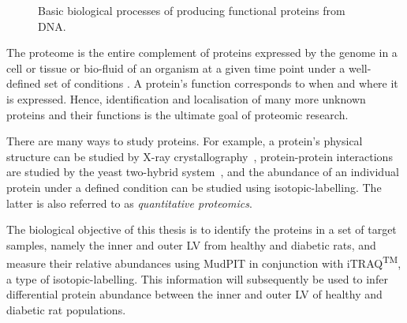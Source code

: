 \documentclass[11pt,a4paper]{article}
\begin{document}
\begin{figure}[hbt]
\caption{Basic biological processes of producing functional proteins from DNA.}
\label{fig:processes}
\end{figure}

The proteome is the entire complement of proteins expressed by the genome in a cell or tissue or bio-fluid of an organism at a given time point under a well-defined set of conditions \citep{Boehm2007}. A protein's function corresponds to when and where it is expressed. Hence, identification and localisation of many more unknown  proteins and their functions is the ultimate goal of proteomic research. 

There are many ways to study proteins. For example, a protein's physical structure can be studied by X-ray crystallography~\citep{Blow2002}, protein-protein interactions are studied by the yeast two-hybrid system~\citep{Fields1989}, and the abundance of an individual protein under a defined condition can be studied using isotopic-labelling. The latter is also referred to as \emph{quantitative proteomics}. 

The biological objective of this thesis is to identify the proteins in a set of target samples, namely the inner and outer LV from healthy and diabetic rats, and measure their relative abundances using MudPIT in conjunction with iTRAQ\textsuperscript{TM}, a type of isotopic-labelling. This information will subsequently be used to infer differential protein abundance between the inner and outer LV of healthy and diabetic rat populations.
\end{document}
